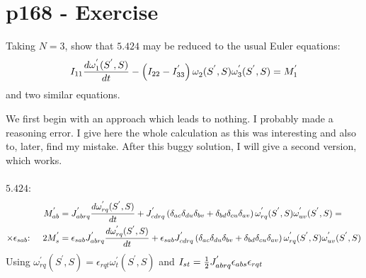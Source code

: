 \section{p168 - Exercise}
\begin{tcolorbox}
Taking $N=3$, show that $\mathbf{5.424}$ may be reduced to the usual Euler equations:
$$ I_{11}\dv{\omega^{'}_1(S^{'},S)}{t}-\left(I_{22}-I^{'}_{33}\right)\omega^{}_2(S^{'},S)\omega^{'}_3(S^{'},S)=M^{'}_1$$ and two similar equations.
\end{tcolorbox}
We first begin with an approach which leads to nothing. I probably made a reasoning error. I give here the whole calculation as this was interesting and also to, later, find my mistake. After this buggy solution, I will give a second version, which works.\\\\
$\mathbf{5.424}$:
\begin{align}
M^{'}_{ab}&=J^{'}_{abrq}\dv{\omega^{'}_{rq}(S^{'},S)}{t}+J^{'}_{cdrq}\left(\delta_{ac}\delta_{du}\delta_{bv}+\delta_{bd}\delta_{cu}\delta_{av}\right)\omega^{'}_{rq}(S^{'},S)\omega^{'}_{uv}(S^{'},S) =\\
\times \epsilon_{sab} \text{: }\quad 2M^{'}_{s}&=\epsilon_{sab }J^{'}_{abrq}\dv{\omega^{'}_{rq}(S^{'},S)}{t}+\epsilon_{sab}J^{'}_{cdrq}\left(\delta_{ac}\delta_{du}\delta_{bv}+\delta_{bd}\delta_{cu}\delta_{av}\right)\omega^{'}_{rq}(S^{'},S)\omega^{'}_{uv}(S^{'},S) 
\end{align}
Using $ \omega^{'}_{rq}(S^{'},S)= \epsilon_{rqt}\omega^{'}_{t}(S^{'},S)$ and $I_{st}=\frac{1}{2} J^{'}_{abrq}\epsilon_{abs}\epsilon_{rqt}$
